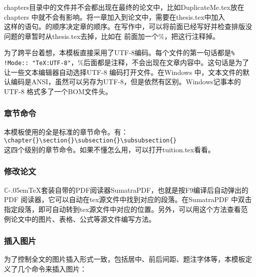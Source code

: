 chapters目录中的文件并不会都出现在最终的论文中，比如DuplicateMe.tex放在chapters 中就不会有影响。将一章加入到论文中，需要在thesis.tex中加入\\
\verb||这样的语句。\verb||的顺序决定章的顺序。在写作中，可以将前面已经写好并检查排版没问题的章暂时从thesis.tex去掉，比如在\verb|| 前面加一个\%，把这行注释掉。

为了跨平台着想，本模板直接采用了UTF-8编码。每个文件的第一句话都是\verb|% !Mode:: "TeX:UTF-8"|，\%后面都是注释，不会出现在文章内容中。这句话是为了让一些文本编辑器自动选择UTF-8 编码打开文件。在Windows 中，文本文件的默认编码是ANSI，虽然可以另存为UTF-8，但是依然有区别。Windows记事本的UTF-8 格式多了一个BOM文件头。

\subsubsection{章节命令}
本模板使用的全是标准的章节命令。有：\\
\verb|\chapter{}\section{}\subsection{}\subsubsection{}|\\
这四个级别的章节命令。如果不懂怎么用，可以打开tuition.tex看看。

\subsubsection{修改论文}
$\mathbb{C}$\kern-.05em\TeX{}套装自带的PDF阅读器SumatraPDF，也就是按F9编译后自动弹出的PDF 阅读器，它可以自动在tex源文件中找到对应的段落。在SumatraPDF 中双击指定段落，即可自动转到tex源文件中对应的位置。另外，可以用这个方法查看范例论文中的图片、表格、公式等源文件编写方法。
\subsubsection{插入图片}
为了控制全文的图片插入形式一致，包括居中、前后间距、题注字体等，本模板定义了几个命令来插入图片：

